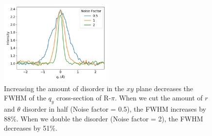 \documentclass[journal=jpcbfk,manuscript=article]{achemso}
\begin{document}
  \begin{figure}
  \centering
  \includegraphics[width=0.5\textwidth]{qy_fwhm.png}
  \caption{Increasing the amount of disorder in the $xy$ plane decreases the
	  FWHM of the $q_y$ cross-section of R-$\pi$. When we cut the amount of $r$ and
	  $\theta$ disorder in half (Noise factor = 0.5), the FWHM increases by 88\%. When
	  we double the disorder (Noise factor = 2), the FWHM decreases by
	  51\%.}\label{fig:qy_fwhm}
  \end{figure}
  
  
\end{document}
